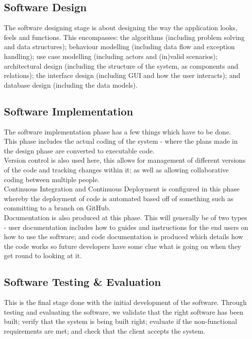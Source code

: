 \subsection{Software Design}
The software designing stage is about designing the way the application looks, feels and functions. This encompasses: the algorithms (including problem solving and data structures); behaviour modelling (including data flow and exception handling); use case modelling (including actors and (in)valid scenarios); architectural design (including the structure of the system, as components and relations); the interface design (including GUI and how the user interacts); and database design (including the data models).

\subsection{Software Implementation}
The software implementation phase has a few things which have to be done.\\

This phase includes the actual coding of the system - where the plans made in the design phase are converted to executable code.\\

Version control is also used here, this allows for management of different versions of the code and tracking changes within it; as well as allowing collaborative coding between multiple people.\\

Continuous Integration and Continuous Deployment is configured in this phase whereby the deployment of code is automated based off of something such as committing to a branch on GitHub.\\

Documentation is also produced at this phase. This will generally be of two types - user documentation includes how to guides and instructions for the end users on how to use the software; and code documentation is produced which details how the code works so future developers have some clue what is going on when they get round to looking at it.

\subsection{Software Testing \& Evaluation}
This is the final stage done with the initial development of the software. Through testing and evaluating the software, we validate that the right software has been built; verify that the system is being built right; evaluate if the non-functional requirements are met; and check that the client accepts the system.\\

